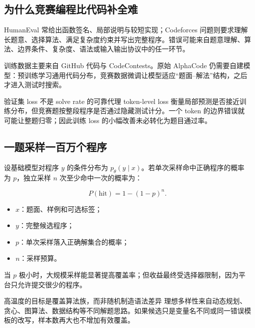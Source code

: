 \documentclass[a4paper]{article}
\begin{document}
\subsection{为什么竞赛编程比代码补全难}

HumanEval 常给出函数签名、局部说明与较短实现；Codeforces 问题则要求理解长题意、选择算法、满足复杂度约束并写出完整程序。错误可能来自题意理解、算法、边界条件、复杂度、语法或输入输出协议中的任一环节。


训练数据主要来自 GitHub 代码与 CodeContests。原始 AlphaCode 仍需要自建模型：预训练学习通用代码分布，竞赛数据微调让模型适应“题面--解法”结构，之后才进入测试时搜索。

\begin{warningbox}{验证集 loss 不是 solve rate 的可靠代理}
token-level loss 衡量局部预测是否接近训练分布，但竞赛题按整段程序是否通过隐藏测试计分。一个 token 的边界错误就可能让整题归零；因此训练 loss 的小幅改善未必转化为题目通过率。
\end{warningbox}

\subsection{一题采样一百万个程序}


设基础模型对程序 $y$ 的条件分布为 $p_\theta(y\mid x)$。若单次采样命中正确程序的概率为 $p$，独立采样 $n$ 次至少命中一次的概率为：

$$
P(\text{hit})=1-(1-p)^n.
$$

\begin{itemize}
    \item $x$：题面、样例和可选标签；
    \item $y$：完整候选程序；
    \item $p$：单次采样落入正确解集合的概率；
    \item $n$：采样预算。
\end{itemize}

当 $p$ 极小时，大规模采样能显著提高覆盖率；但收益最终受选择器限制，因为平台只允许提交很少的程序。

\begin{importantbox}{高温度的目标是覆盖算法族，而非随机制造语法差异}
理想多样性来自动态规划、贪心、图算法、数据结构等不同解题思路。如果候选只是变量名不同或同一错误模板的改写，样本数再大也不增加有效覆盖。
\end{importantbox}
\end{document}
